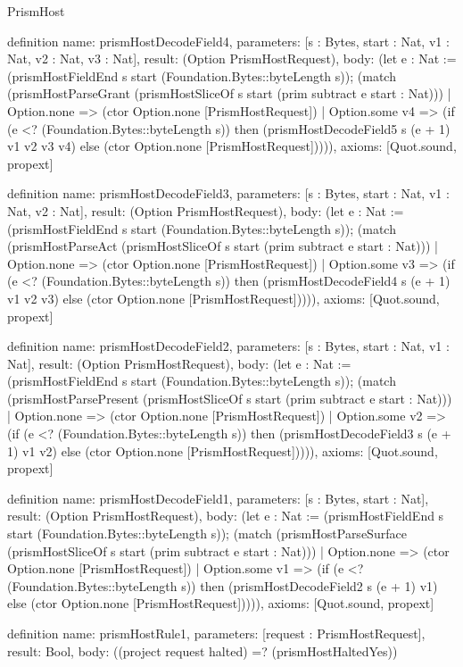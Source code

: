 \begin{lexlean}{PrismHost}
\begin{semanticmodule}
definition{
  name: prismHostDecodeField4,
  parameters: [s : Bytes, start : Nat, v1 : Nat, v2 : Nat, v3 : Nat],
  result: (Option PrismHostRequest),
  body: (let e : Nat := (prismHostFieldEnd s start (Foundation.Bytes::byteLength s)); (match (prismHostParseGrant (prismHostSliceOf s start (prim subtract e start : Nat)))
    | Option.none => (ctor Option.none [PrismHostRequest])
    | Option.some v4 => (if (e <? (Foundation.Bytes::byteLength s)) then (prismHostDecodeField5 s (e + 1) v1 v2 v3 v4) else (ctor Option.none [PrismHostRequest])))),
  axioms: [Quot.sound, propext]
}

definition{
  name: prismHostDecodeField3,
  parameters: [s : Bytes, start : Nat, v1 : Nat, v2 : Nat],
  result: (Option PrismHostRequest),
  body: (let e : Nat := (prismHostFieldEnd s start (Foundation.Bytes::byteLength s)); (match (prismHostParseAct (prismHostSliceOf s start (prim subtract e start : Nat)))
    | Option.none => (ctor Option.none [PrismHostRequest])
    | Option.some v3 => (if (e <? (Foundation.Bytes::byteLength s)) then (prismHostDecodeField4 s (e + 1) v1 v2 v3) else (ctor Option.none [PrismHostRequest])))),
  axioms: [Quot.sound, propext]
}

definition{
  name: prismHostDecodeField2,
  parameters: [s : Bytes, start : Nat, v1 : Nat],
  result: (Option PrismHostRequest),
  body: (let e : Nat := (prismHostFieldEnd s start (Foundation.Bytes::byteLength s)); (match (prismHostParsePresent (prismHostSliceOf s start (prim subtract e start : Nat)))
    | Option.none => (ctor Option.none [PrismHostRequest])
    | Option.some v2 => (if (e <? (Foundation.Bytes::byteLength s)) then (prismHostDecodeField3 s (e + 1) v1 v2) else (ctor Option.none [PrismHostRequest])))),
  axioms: [Quot.sound, propext]
}

definition{
  name: prismHostDecodeField1,
  parameters: [s : Bytes, start : Nat],
  result: (Option PrismHostRequest),
  body: (let e : Nat := (prismHostFieldEnd s start (Foundation.Bytes::byteLength s)); (match (prismHostParseSurface (prismHostSliceOf s start (prim subtract e start : Nat)))
    | Option.none => (ctor Option.none [PrismHostRequest])
    | Option.some v1 => (if (e <? (Foundation.Bytes::byteLength s)) then (prismHostDecodeField2 s (e + 1) v1) else (ctor Option.none [PrismHostRequest])))),
  axioms: [Quot.sound, propext]
}

definition{
  name: prismHostRule1,
  parameters: [request : PrismHostRequest],
  result: Bool,
  body: ((project request halted) =? (prismHostHaltedYes))
}


\end{semanticmodule}
\end{lexlean}

